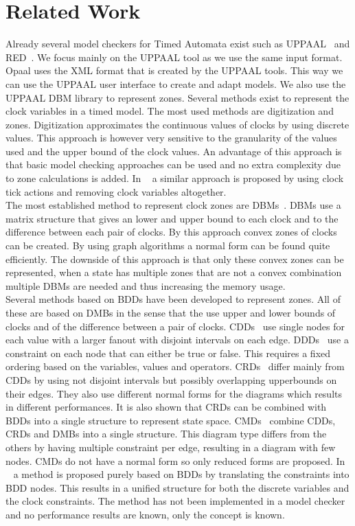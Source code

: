 \documentclass[11pt]{article}
\begin{document}
\section{Related Work}
Already several model checkers for Timed Automata exist such as UPPAAL~\cite{UPPAAL} and RED~\cite{crds}. We focus mainly on the UPPAAL tool as we use the same input format. Opaal uses the XML format that is created by the UPPAAL tools. This way we can use the UPPAAL user interface to create and adapt models. We also use the UPPAAL DBM library to represent zones.
Several methods exist to represent the clock variables in a timed model. The most used methods are digitization and zones. 
Digitization approximates the continuous values of clocks by using discrete values. This approach is however very sensitive to the granularity of the values used and the upper bound of the clock values. An advantage of this approach is that basic model checking approaches can be used and no extra complexity due to zone calculations is added. In ~\cite{nguyen2012discrete} a similar approach is proposed by using clock tick actions and removing clock variables altogether. 
\\The most established method to represent clock zones are DBMs~\cite{dbmorig, bengtsson2002clocks}. DBMs use a matrix structure that gives an lower and upper bound to each clock and to the difference between each pair of clocks. By this approach convex zones of clocks can be created. By using graph algorithms a normal form can be found quite efficiently. The downside of this approach is that only these convex zones can be represented, when a state has multiple zones that are not a convex combination multiple DBMs are needed and thus increasing the memory usage. 
\\Several methods based on BDDs have been developed to represent zones. All of these are based on DMBs in the sense that the use upper and lower bounds of clocks and of the difference between a pair of clocks. CDDs~\cite{BRICS19491} use single nodes for each value with a larger fanout with disjoint intervals on each edge. DDDs~\cite{ddds} use a constraint on each node that can either be true or false. This requires a fixed ordering based on the variables, values and operators. CRDs~\cite{crds} differ mainly from CDDs by using not disjoint intervals but possibly overlapping upperbounds on their edges. They also use different normal forms for the diagrams which results in different performances. It is also shown that CRDs can be combined with BDDs into a single structure to represent state space. CMDs~\cite{5702245} combine CDDs, CRDs and DMBs into a single structure. This diagram type differs from the others by having multiple constraint per edge, resulting in a diagram with few nodes. CMDs do not have a normal form so only reduced forms are proposed. In ~\cite{7098276, 7184781} a method is proposed purely based on BDDs by translating the constraints into BDD nodes. This results in a unified structure for both the discrete variables and the clock constraints. The method has not been implemented in a model checker and no performance results are known, only the concept is known.  
\end{document}
